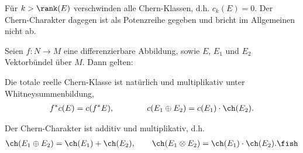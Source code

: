\documentclass[%
	paper=a5,%
	fleqn,%
	DIV=18,%
	BCOR=0mm,
	fontsize=11pt,
	titlepage=false,%
	bibliography=totoc,
	DIV=18,%
	twoside=true,
	pdftitle=Riemannsche Geometrie,
	pdfauthor=Uwe Semmelmann,
	numbers=noendperiod]%
	{scrbook}
\begin{document}
\begin{rem}
Für $k> \rank(E)$ verschwinden alle Chern-Klassen, d.h. $c_k(E) = 0$. Der
Chern-Charakter dagegen ist als Potenzreihe gegeben und bricht im Allgemeinen
nicht ab.\map
\end{rem}

\begin{lem}
Seien $f\colon N\to M$ eine differenzierbare Abbildung, sowie $E$, $E_1$ und $E_2$
Vektorbündel über $M$. Dann gelten:
\begin{propenum}
\item Die totale reelle Chern-Klasse ist natürlich und multiplikativ unter Whitneysummenbildung,
\begin{align*}
f^*c(E) = c(f^*E),\qquad\qquad c(E_1\oplus E_2) = c(E_1)\cdot \ch(E_2).
\end{align*}
\item Der Chern-Charakter ist additiv und multiplikativ, d.h.
\begin{align*}
\ch(E_1\oplus E_2 ) = \ch(E_1) + \ch(E_2),\qquad
\ch(E_1\otimes E_2) = \ch(E_1)\cdot\ch(E_2).\fish
\end{align*}
\end{propenum}
\end{lem}
\end{document}
